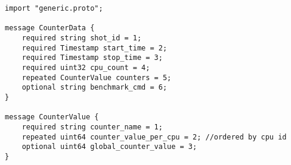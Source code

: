 \begin{Verbatim}[baselinestretch=1,fontsize=\scriptsize]
import "generic.proto";

message CounterData {
    required string shot_id = 1;
    required Timestamp start_time = 2;
    required Timestamp stop_time = 3;
    required uint32 cpu_count = 4;
    repeated CounterValue counters = 5;
    optional string benchmark_cmd = 6;
}

message CounterValue {
    required string counter_name = 1;
    repeated uint64 counter_value_per_cpu = 2; //ordered by cpu id
    optional uint64 global_counter_value = 3;
}
\end{Verbatim}
